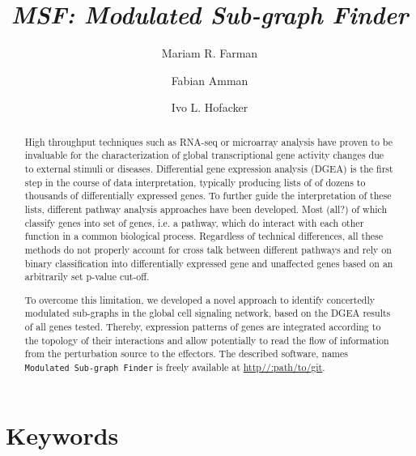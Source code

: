 \documentclass[10pt,a4paper,twocolumn]{article}
\newcommand{\TODO}[1]{\begingroup\color{red}#1\endgroup}
\begin{document}
\title{\textit{MSF: Modulated Sub-graph Finder} }

\author[1]{Mariam R. Farman}
\author[1,2]{Fabian Amman}
\author[1]{Ivo L. Hofacker}



\maketitle
\thispagestyle{fancy}

\begin{abstract}

High throughput techniques such as RNA-seq or microarray analysis have
proven to be invaluable for the characterization of global
transcriptional gene activity changes due to external stimuli or
diseases. Differential gene expression analysis (DGEA) is the first
step in the course of data interpretation, typically producing lists
of of dozens to thousands of differentially expressed genes. To
further guide the interpretation of these lists, different pathway
analysis approaches have been developed. Most (\TODO{all?}) of which
classify genes into set of genes, i.e. a pathway, which do interact
with each other function in a common biological process. Regardless of
technical differences, all these methods do not properly account for
cross talk between different pathways and rely on binary
classification into differentially expressed gene and unaffected genes
based on an arbitrarily set p-value cut-off.

To overcome this limitation, we developed a novel approach to identify
concertedly modulated sub-graphs in the global cell signaling network,
based on the DGEA results of all genes tested. Thereby, expression
patterns of genes are integrated according to the topology of their
interactions and allow potentially to read the flow of information
from the perturbation source to the effectors. The described software,
names \texttt{Modulated Sub-graph Finder} is freely available at
\url{http//:path/to/git}.

\end{abstract}

\section*{Keywords}
\end{document}
